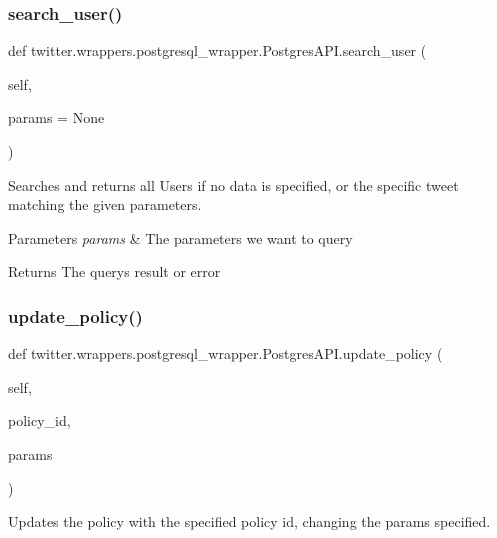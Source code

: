 \subsubsection{\texorpdfstring{search\+\_\+user()}{search\_user()}}
{\footnotesize\ttfamily def twitter.\+wrappers.\+postgresql\+\_\+wrapper.\+Postgres\+A\+P\+I.\+search\+\_\+user (\begin{DoxyParamCaption}\item[{}]{self,  }\item[{}]{params = {\ttfamily None} }\end{DoxyParamCaption})}



Searches and returns all Users if no data is specified, or the specific tweet matching the given parameters. 


\begin{DoxyParams}{Parameters}
{\em params} & The parameters we want to query \\
\hline
\end{DoxyParams}
\begin{DoxyReturn}{Returns}
The query\textquotesingle{}s result or error 
\end{DoxyReturn}
\mbox{\label{classtwitter_1_1wrappers_1_1postgresql__wrapper_1_1PostgresAPI_aa32ee622eb02190f09ec38919123bbb5}} 
\subsubsection{\texorpdfstring{update\+\_\+policy()}{update\_policy()}}
{\footnotesize\ttfamily def twitter.\+wrappers.\+postgresql\+\_\+wrapper.\+Postgres\+A\+P\+I.\+update\+\_\+policy (\begin{DoxyParamCaption}\item[{}]{self,  }\item[{}]{policy\+\_\+id,  }\item[{}]{params }\end{DoxyParamCaption})}



Updates the policy with the specified policy id, changing the params specified. 


